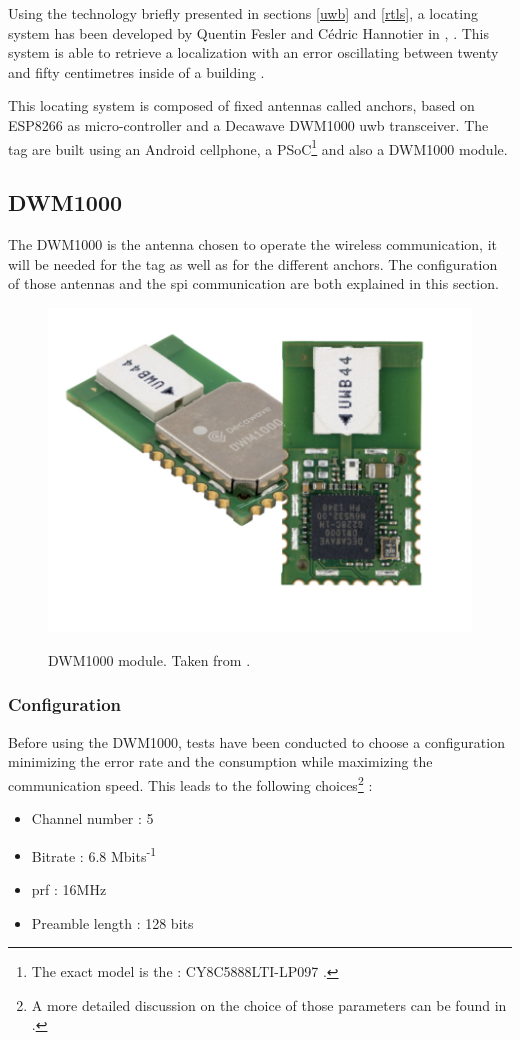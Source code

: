 Using the technology briefly presented in sections \ref{uwb} and \ref{rtls}, a locating system has been developed by Quentin Fesler and Cédric Hannotier in  \cite{fesler2018high}, \cite{hannotier2019indoor}. This system is able to retrieve a localization with an error oscillating between twenty and fifty centimetres inside of a building \cite{guyard2019navigation}.
\vspace{2mm}

This locating system is composed of fixed antennas called anchors, based on ESP8266 as micro-controller and a Decawave DWM1000 \gls{uwb} transceiver\cite{decawave}. The tag are built using an Android cellphone, a PSoC\footnote{The exact model is the : CY8C5888LTI-LP097 \cite{guyard2019navigation}.} and also a DWM1000 module.

\subsection{DWM1000}
\label{dwm1000}

The DWM1000 is the antenna chosen to operate the wireless communication, it will be needed for the tag as well as for the different anchors. The configuration of those antennas and the \gls{spi} communication are both explained in this section.

\begin{figure}[H]
	\centering
	\includegraphics[width=.3\linewidth]{Images/DWM1000.png}
	\label{fig:dwm1000}
	\caption{DWM1000 module. Taken from \cite{decawave}.}
\end{figure}

\subsubsection{Configuration}

Before using the DWM1000, tests have been conducted to choose a configuration minimizing the error rate and the consumption while maximizing the communication speed. This leads to the following choices\footnote{A more detailed discussion on the choice of those parameters can be found in \cite{hannotier2019indoor}.} :

\begin{itemize}
\item Channel number : 5
\item Bitrate : 6.8 Mbits\textsuperscript{-1}
\item \gls{prf} : 16MHz
\item Preamble length : 128 bits
\end{itemize}

